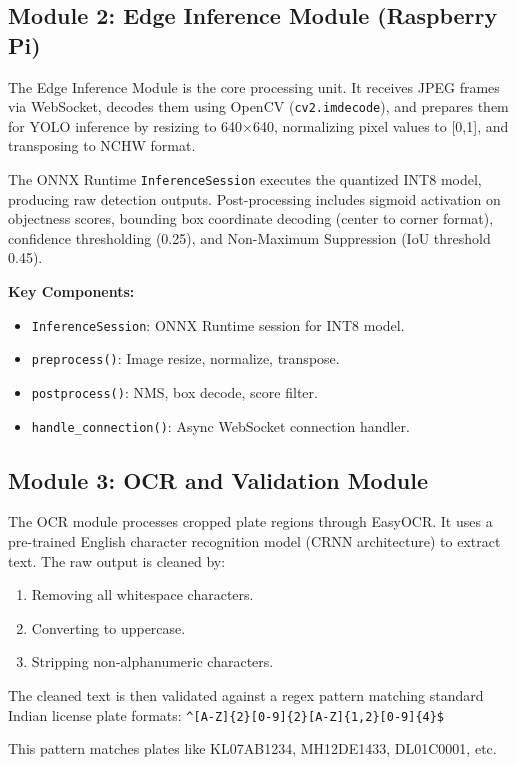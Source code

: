 \subsection{Module 2: Edge Inference Module (Raspberry Pi)}
The Edge Inference Module is the core processing unit. It receives JPEG frames via WebSocket, decodes them using OpenCV (\texttt{cv2.imdecode}), and prepares them for YOLO inference by resizing to 640$\times$640, normalizing pixel values to [0,1], and transposing to NCHW format.

The ONNX Runtime \texttt{InferenceSession} executes the quantized INT8 model, producing raw detection outputs. Post-processing includes sigmoid activation on objectness scores, bounding box coordinate decoding (center to corner format), confidence thresholding (0.25), and Non-Maximum Suppression (IoU threshold 0.45).

\textbf{Key Components:}
\begin{itemize}
    \item \texttt{InferenceSession}: ONNX Runtime session for INT8 model.
    \item \texttt{preprocess()}: Image resize, normalize, transpose.
    \item \texttt{postprocess()}: NMS, box decode, score filter.
    \item \texttt{handle\_connection()}: Async WebSocket connection handler.
\end{itemize}

\subsection{Module 3: OCR and Validation Module}
The OCR module processes cropped plate regions through EasyOCR. It uses a pre-trained English character recognition model (CRNN architecture) to extract text. The raw output is cleaned by:
\begin{enumerate}
    \item Removing all whitespace characters.
    \item Converting to uppercase.
    \item Stripping non-alphanumeric characters.
\end{enumerate}

The cleaned text is then validated against a regex pattern matching standard Indian license plate formats: \texttt{\^{}[A-Z]\{2\}[0-9]\{2\}[A-Z]\{1,2\}[0-9]\{4\}\$}

This pattern matches plates like KL07AB1234, MH12DE1433, DL01C0001, etc.

